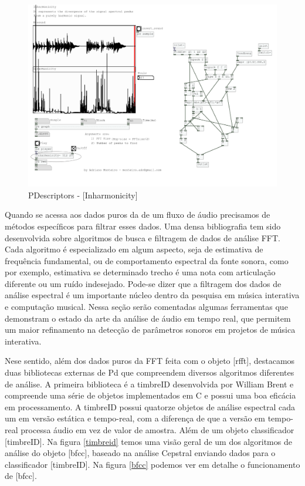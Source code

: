 \documentclass{ppgmus}
\begin{document}
\begin{figure}[-h]
\includegraphics[scale=.7]{pdescriptor}
\caption{PDescriptors - [Inharmonicity\texttildelow]}
\label{pdescriptor}
\end{figure} 


Quando se acessa aos dados puros da de um fluxo de áudio precisamos de 
métodos específicos para filtrar esses dados. Uma densa bibliografia
tem sido desenvolvida sobre algoritmos de busca e filtragem de dados de
análise FFT. Cada algoritmo é especializado em algum aspecto, seja de
estimativa de frequência fundamental, ou de comportamento espectral da fonte sonora,
como por exemplo, estimativa se determinado trecho é uma nota com articulação diferente
ou um ruído indesejado.
Pode-se dizer que a filtragem dos dados de análise espectral é um importante
núcleo dentro da pesquisa em música interativa e computação musical. Nessa seção
serão comentadas algumas ferramentas que demonstram o estado da arte da análise de 
áudio em tempo real, que permitem um maior refinamento na detecção de parâmetros
sonoros em projetos de música interativa.

Nese sentido, além dos dados puros da FFT feita com o objeto [rfft\texttildelow],
destacamos duas bibliotecas externas de Pd que compreendem diversos algoritmos
diferentes de análise. A primeira biblioteca é a 
timbreID desenvolvida por William Brent e compreende uma série de objetos
implementados em C e possui uma boa eficácia em processamento. A timbreID possui 
quatorze objetos de análise espectral cada um em versão estática e tempo-real, com a diferença
de que a versão em tempo-real processa áudio em vez de valor de amostra. Além
de um objeto classificador [timbreID]. Na figura \ref{timbreid} temos
uma visão geral de um dos algoritmos de análise do objeto  [bfcc\texttildelow], baseado na 
análise Cepstral enviando dados para o classificador [timbreID]. Na figura \ref{bfcc} podemos
ver em detalhe o funcionamento de [bfcc\texttildelow].
\end{document}
